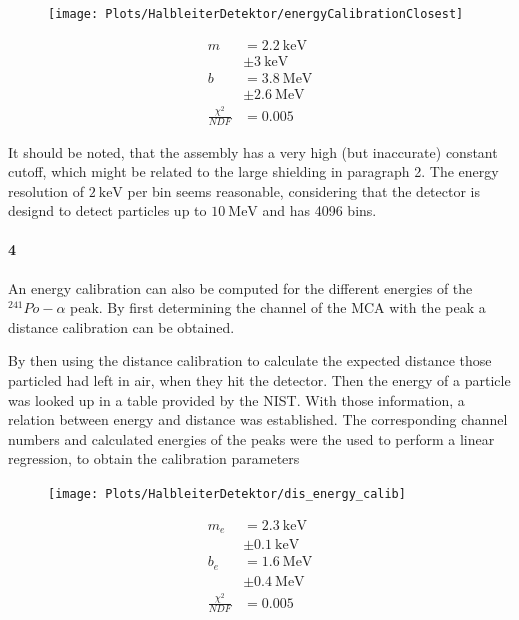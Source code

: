 \documentclass[12pt,twoside,a4paper]{scrartcl}
\begin{document}
			\begin{figure}[H]
					\begin{minipage}{0.69 \textwidth}
						\texttt{[image: Plots/HalbleiterDetektor/energyCalibrationClosest]}
					\end{minipage}
					\begin{minipage}{0.29 \textwidth}
						\begin{align*}
							m &= \SI{2.2}{\kilo \electronvolt}\\ &\pm \SI{3}{\kilo \electronvolt} \\
							b &= \SI{3.8}{\mega \electronvolt}\\ &\pm \SI{2.6}{\mega \electronvolt} \\
							\frac{\chi^2}{NDF} &= 0.005
						\end{align*}
					\end{minipage}
				\end{figure}

				It should be noted, that the assembly has a very high (but inaccurate) constant cutoff, which might be related to the large shielding in paragraph 2. The energy resolution of $\SI{2}{\kilo \electronvolt}$ per bin seems reasonable, considering that the detector is designd to detect particles up to $\SI{10}{\mega \electronvolt}$ and has 4096 bins.

		\paragraph{4}

			An energy calibration can also be computed for the different energies of the $^{241}Po-\alpha$ peak. By first determining the channel of the MCA with the peak a distance calibration can be obtained.

			By then using the distance calibration to calculate the expected distance those particled had left in air, when they hit the detector. Then the energy of a particle was looked up in a table provided by the NIST.
			With those information, a relation between energy and distance was established. The corresponding channel numbers and calculated energies of the peaks were the used to perform a linear regression, to obtain the calibration parameters

			\begin{figure}[H]
					\begin{minipage}{0.69 \textwidth}
						\texttt{[image: Plots/HalbleiterDetektor/dis\_energy\_calib]}
					\end{minipage}
					\begin{minipage}{0.29 \textwidth}
						\begin{align*}
							m_e &= \SI{2.3}{\kilo \electronvolt}\\ &\pm \SI{0.1}{\kilo \electronvolt} \\
							b_e &= \SI{1.6}{\mega \electronvolt}\\ &\pm \SI{0.4}{\mega \electronvolt} \\
							\frac{\chi^2}{NDF} &= 0.005
						\end{align*}
					\end{minipage}
				\end{figure}
\end{document}

